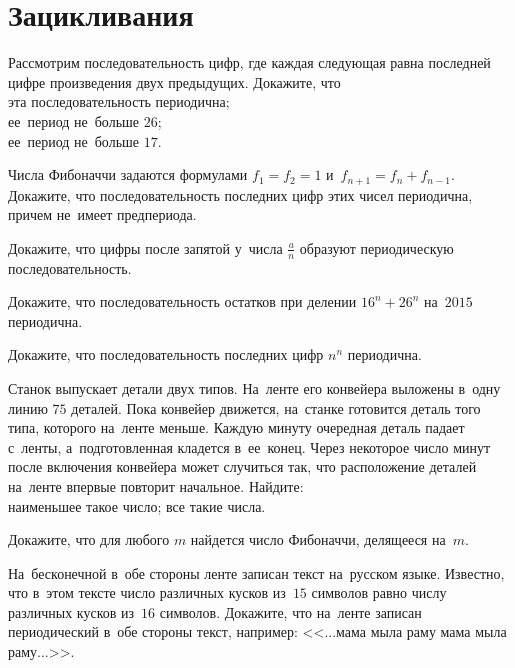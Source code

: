 
\section*{Зацикливания}


\begin{problems}

\item
Рассмотрим последовательность цифр, где каждая следующая равна последней цифре
произведения двух предыдущих.
Докажите, что
\\
\sp эта последовательность периодична;
\\
\sp ее~период не~больше $26$;
\\
\sp ее~период не~больше $17$.

\item
Числа Фибоначчи задаются формулами
$f_1 = f_2 = 1$ и~$f_{n + 1} = f_n + f_{n - 1}$.
Докажите, что последовательность последних цифр этих чисел периодична, причем
не~имеет предпериода.

\item
Докажите, что цифры после запятой у~числа $\frac{a}{n}$ образуют периодическую
последовательность.

\item
Докажите, что последовательность остатков при делении $16^n + 26^n$ на~$2015$
периодична.

\item
Докажите, что последовательность последних цифр $n^n$ периодична.

\item
Станок выпускает детали двух типов.
На~ленте его конвейера выложены в~одну линию $75$ деталей.
Пока конвейер движется, на~станке готовится деталь того типа, которого на~ленте
меньше.
Каждую минуту очередная деталь падает с~ленты, а~подготовленная кладется
в~ее~конец.
Через некоторое число минут после включения конвейера может случиться так, что
расположение деталей на~ленте впервые повторит начальное.
Найдите:
\\
\sp наименьшее такое число;
\quad
\sp все такие числа.

\item
Докажите, что для любого $m$ найдется число Фибоначчи, делящееся на~$m$.

\item
На~бесконечной в~обе стороны ленте записан текст на~русском языке.
Известно, что в~этом тексте число различных кусков из~$15$ символов равно числу
различных кусков из~$16$ символов.
Докажите, что на~ленте записан периодический в~обе стороны текст, например:
<<...мама мыла раму мама мыла раму...>>.


\end{problems}
